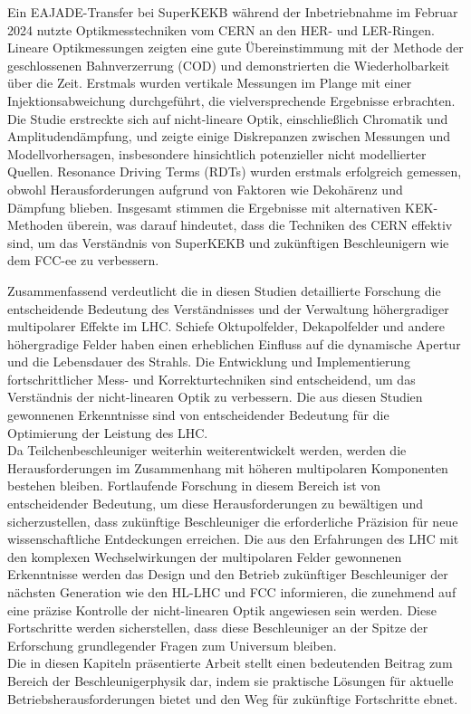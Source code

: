 {%
Ein EAJADE-Transfer bei SuperKEKB während der Inbetriebnahme im Februar 2024 nutzte
Optikmesstechniken vom CERN an den HER- und LER-Ringen. Lineare Optikmessungen zeigten eine gute
Übereinstimmung mit der Methode der geschlossenen Bahnverzerrung (COD) und demonstrierten die
Wiederholbarkeit über die Zeit. Erstmals wurden vertikale Messungen im Plange mit einer
Injektionsabweichung durchgeführt, die vielversprechende Ergebnisse erbrachten. Die Studie
erstreckte sich auf nicht-lineare Optik, einschließlich Chromatik und Amplitudendämpfung, und zeigte
einige Diskrepanzen zwischen Messungen und Modellvorhersagen, insbesondere hinsichtlich potenzieller
nicht modellierter Quellen. Resonance Driving Terms (RDTs) wurden erstmals erfolgreich gemessen,
obwohl Herausforderungen aufgrund von Faktoren wie Dekohärenz und Dämpfung blieben. Insgesamt
stimmen die Ergebnisse mit alternativen KEK-Methoden überein, was darauf hindeutet, dass die
Techniken des CERN effektiv sind, um das Verständnis von SuperKEKB und zukünftigen Beschleunigern
wie dem FCC-ee zu verbessern.

Zusammenfassend verdeutlicht die in diesen Studien detaillierte Forschung die entscheidende
Bedeutung des Verständnisses und der Verwaltung höhergradiger multipolarer Effekte im LHC. Schiefe
Oktupolfelder, Dekapolfelder und andere höhergradige Felder haben einen erheblichen Einfluss auf die
dynamische Apertur und die Lebensdauer des Strahls. Die Entwicklung und Implementierung
fortschrittlicher Mess- und Korrekturtechniken sind entscheidend, um das Verständnis der
nicht-linearen Optik zu verbessern. Die aus diesen Studien gewonnenen Erkenntnisse sind von
entscheidender Bedeutung für die Optimierung der Leistung des LHC.
\\
\indent Da Teilchenbeschleuniger weiterhin weiterentwickelt werden, werden die Herausforderungen im
Zusammenhang mit höheren multipolaren Komponenten bestehen bleiben. Fortlaufende Forschung in diesem
Bereich ist von entscheidender Bedeutung, um diese Herausforderungen zu bewältigen und
sicherzustellen, dass zukünftige Beschleuniger die erforderliche Präzision für neue
wissenschaftliche Entdeckungen erreichen. Die aus den Erfahrungen des LHC mit den komplexen
Wechselwirkungen der multipolaren Felder gewonnenen Erkenntnisse werden das Design und den Betrieb
zukünftiger Beschleuniger der nächsten Generation wie den HL-LHC und FCC informieren, die zunehmend
auf eine präzise Kontrolle der nicht-linearen Optik angewiesen sein werden. Diese Fortschritte
werden sicherstellen, dass diese Beschleuniger an der Spitze der Erforschung grundlegender Fragen
zum Universum bleiben.
\\
\indent Die in diesen Kapiteln präsentierte Arbeit stellt einen bedeutenden Beitrag zum Bereich der
Beschleunigerphysik dar, indem sie praktische Lösungen für aktuelle Betriebsherausforderungen bietet
und den Weg für zukünftige Fortschritte ebnet.


}